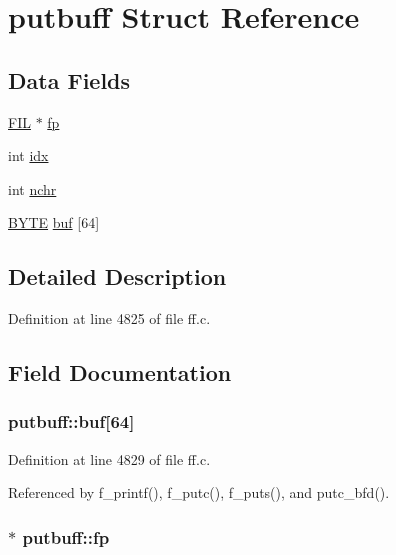 \hypertarget{structputbuff}{\section{putbuff Struct Reference}
\label{structputbuff}
}
\subsection*{Data Fields}
\begin{DoxyCompactItemize}
\item 
\hyperlink{structFIL}{F\-I\-L} $\ast$ \hyperlink{structputbuff_a5c7baa85e569be17f4888f5d92f4453c}{fp}
\item 
int \hyperlink{structputbuff_a10a3ca93af8df07e9836ebd5230c06d8}{idx}
\item 
int \hyperlink{structputbuff_a125366bfe48077e6f562f95e30b4604a}{nchr}
\item 
\hyperlink{integer_8h_a4ae1dab0fb4b072a66584546209e7d58}{B\-Y\-T\-E} \hyperlink{structputbuff_ae623199e5d2851f95050670170f20329}{buf} \mbox{[}64\mbox{]}
\end{DoxyCompactItemize}


\subsection{Detailed Description}


Definition at line 4825 of file ff.\-c.



\subsection{Field Documentation}
\hypertarget{structputbuff_ae623199e5d2851f95050670170f20329}{
\subsubsection[{buf}]{ putbuff\-::buf\mbox{[}64\mbox{]}}}\label{structputbuff_ae623199e5d2851f95050670170f20329}


Definition at line 4829 of file ff.\-c.



Referenced by f\-\_\-printf(), f\-\_\-putc(), f\-\_\-puts(), and putc\-\_\-bfd().

\hypertarget{structputbuff_a5c7baa85e569be17f4888f5d92f4453c}{
\subsubsection[{fp}]{$\ast$ putbuff\-::fp}}\label{structputbuff_a5c7baa85e569be17f4888f5d92f4453c}


